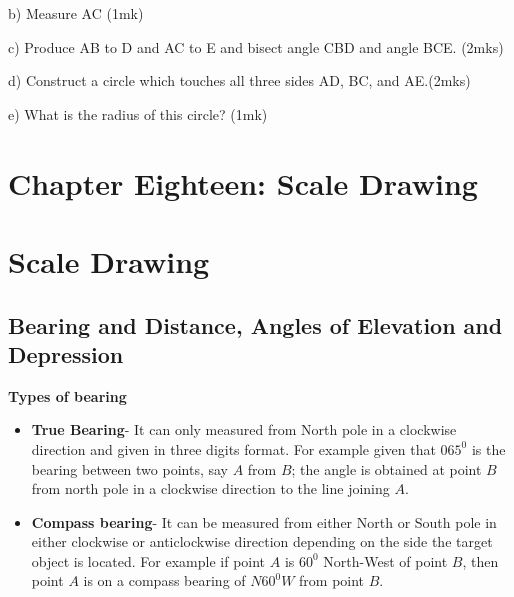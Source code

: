 \documentclass[
  a4paperpaper,
]{scrbook}
\begin{document}
\begin{tcolorbox}
\begin{enumerate}
  b) Measure AC \hspace{10.8cm} (1mk)

  c) Produce AB to D and AC to E and bisect angle CBD and angle
  BCE.\hspace{1.4cm} (2mks)

  d) Construct a circle which touches all three sides AD, BC, and
  AE.\hspace{1.7cm}(2mks)

  e) What is the radius of this circle? \hspace{7.4cm} (1mk)
\end{enumerate}

\end{tcolorbox}


\chapter{Chapter Eighteen: Scale
Drawing}\label{chapter-eighteen-scale-drawing}


\chapter*{Scale Drawing}\label{scale-drawing}


\section{Bearing and Distance, Angles of Elevation and
Depression}\label{bearing-and-distance-angles-of-elevation-and-depression}

\textbf{Types of bearing}

\begin{itemize}
\item
  \textbf{True Bearing}- It can only measured from North pole in a
  clockwise direction and given in three digits format. For example
  given that \(065^0\) is the bearing between two points, say \(A\) from
  \(B\); the angle is obtained at point \(B\) from north pole in a
  clockwise direction to the line joining \(A\).
\item
  \textbf{Compass bearing}- It can be measured from either North or
  South pole in either clockwise or anticlockwise direction depending on
  the side the target object is located. For example if point \(A\) is
  \(60^0\) North-West of point \(B\), then point \(A\) is on a compass
  bearing of \(N60^0W\) from point \(B\).
\end{itemize}
\end{document}
